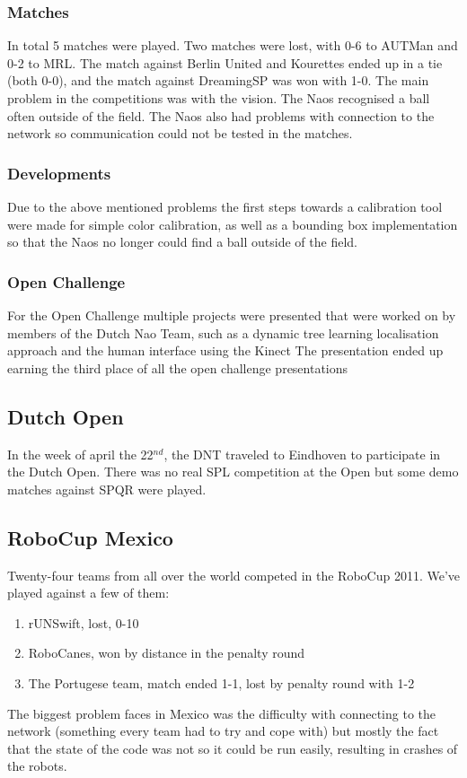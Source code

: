 \documentclass[11pt,a4paper,oneside]{article}
\begin{document}
\subsubsection{Matches}
In total 5 matches were played. Two matches were lost, with 0-6 to AUTMan and 0-2 to MRL. The match against Berlin United and Kourettes ended up in a tie (both 0-0), and the match against DreamingSP was won with 1-0.
The main problem in the competitions was with the vision. The Naos recognised a ball often outside of the field. The Naos also had problems with connection to the network so communication could not be tested in the matches.

\subsubsection{Developments}
Due to the above mentioned problems the first steps towards a calibration tool were made for simple color calibration, as well as a bounding box implementation so that the Naos no longer could find a ball outside of the field.

\subsubsection{Open Challenge}
For the Open Challenge multiple projects were presented that were worked on by members of the Dutch Nao Team, such as a dynamic tree learning localisation approach and the human interface using the Kinect\cite{DutchNaoTeamTech11}
The presentation ended up earning the third place of all the open challenge presentations

\subsection{Dutch Open}
In the week of april the 22$^{nd}$, the DNT traveled to Eindhoven to participate in the Dutch Open. There was no real SPL competition at the Open but some demo matches against SPQR were played.

\subsection{RoboCup Mexico}
Twenty-four teams from all over the world competed in the RoboCup 2011. We've played against a few of them:
\begin{enumerate}
\item rUNSwift, lost, 0-10
\item RoboCanes, won by distance in the penalty round
\item The Portugese team, match ended 1-1, lost by penalty round with 1-2
\end{enumerate}
The biggest problem faces in Mexico was the difficulty with connecting to the network (something every team had to try and cope with) but mostly the fact that the state of the code was not so it could be run easily, resulting in crashes of the robots.
\end{document}
